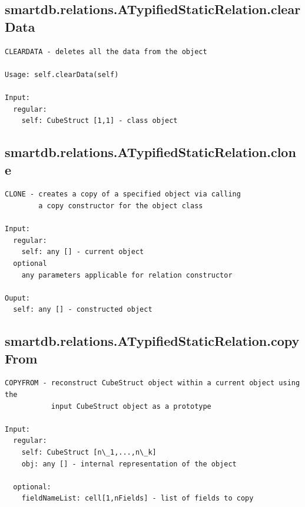 \documentclass[letterpaper,10pt,english]{sphinxmanual}
\begin{document}
\subsection{smartdb.relations.ATypifiedStaticRelation.clearData}
\label{chap_functions:smartdb-relations-atypifiedstaticrelation-cleardata}
\begin{Verbatim}[commandchars=\\\{\}]
CLEARDATA - deletes all the data from the object

Usage: self.clearData(self)

Input:
  regular:
    self: CubeStruct [1,1] - class object
\end{Verbatim}


\subsection{smartdb.relations.ATypifiedStaticRelation.clone}
\label{chap_functions:smartdb-relations-atypifiedstaticrelation-clone}
\begin{Verbatim}[commandchars=\\\{\}]
CLONE - creates a copy of a specified object via calling
        a copy constructor for the object class

Input:
  regular:
    self: any [] - current object
  optional
    any parameters applicable for relation constructor

Ouput:
  self: any [] - constructed object
\end{Verbatim}


\subsection{smartdb.relations.ATypifiedStaticRelation.copyFrom}
\label{chap_functions:smartdb-relations-atypifiedstaticrelation-copyfrom}
\begin{Verbatim}[commandchars=\\\{\}]
COPYFROM - reconstruct CubeStruct object within a current object using the
           input CubeStruct object as a prototype

Input:
  regular:
    self: CubeStruct [n\_1,...,n\_k]
    obj: any [] - internal representation of the object

  optional:
    fieldNameList: cell[1,nFields] - list of fields to copy
\end{Verbatim}
\end{document}
